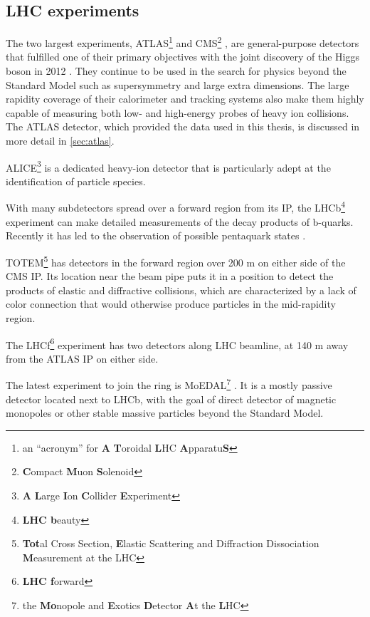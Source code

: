 \subsection{LHC experiments}
The two largest \lhc experiments, ATLAS\footnote{an ``acronym'' for \textbf{A} \textbf{T}oroidal \textbf{L}HC \textbf{A}pparatu\textbf{S}} \cite{Aad:2008zzm} and CMS\footnote{\textbf{C}ompact \textbf{M}uon \textbf{S}olenoid} \cite{Chatrchyan:2008aa}, are general-purpose detectors that fulfilled one of their primary objectives with the joint discovery of the Higgs boson in 2012 \cite{HIGG-2012-27,Chatrchyan:2012xdj}.
They continue to be used in the search for physics beyond the Standard Model such as supersymmetry and large extra dimensions.
The large rapidity coverage of their calorimeter and tracking systems also make them highly capable of measuring both low- and high-energy probes of heavy ion collisions.
The ATLAS detector, which provided the data used in this thesis, is discussed in more detail in \cref{sec:atlas}.

ALICE\footnote{\textbf{A} \textbf{L}arge \textbf{I}on \textbf{C}ollider \textbf{E}xperiment} \cite{Aamodt:2008zz} is a dedicated heavy-ion detector that is particularly adept at the identification of particle species.

With many subdetectors spread over a forward region from its \ac{IP}, the LHCb\footnote{\textbf{LHC b}eauty} experiment \cite{Alves:2008zz} can make detailed measurements of the decay products of b-quarks. Recently it has led to the observation of possible pentaquark states \cite{Aaij:2015tga}.

TOTEM\footnote{\textbf{Tot}al Cross Section, \textbf{E}lastic Scattering and Diffraction Dissociation \textbf{M}easurement at the LHC} \cite{Anelli:2008zza} has detectors in the forward region over 200 m on either side of the CMS \ac{IP}.
Its location near the beam pipe puts it in a position to detect the products of elastic and diffractive collisions, which are characterized by a lack of color connection that would otherwise produce particles in the mid-rapidity region.

The LHCf\footnote{\textbf{LHC f}orward} experiment \cite{Adriani:2008zz} has two detectors along LHC beamline, at 140 m away from the ATLAS \ac{IP} on either side.

The latest experiment to join the ring is MoEDAL\footnote{the \textbf{Mo}nopole and \textbf{E}xotics \textbf{D}etector \textbf{A}t the \textbf{L}HC} \cite{Acharya:2014nyr}.
It is a mostly passive detector located next to LHCb, with the goal of direct detector of magnetic monopoles or other stable massive particles beyond the Standard Model.

